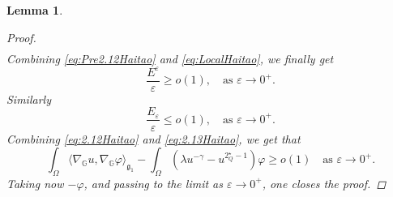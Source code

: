 \documentclass[11pt]{amsart}
\numberwithin{equation}{section} %
\newtheorem{lemma}[teo]{Lemma}
\theoremstyle{definition}
\begin{document}
\begin{lemma}
\begin{proof}
\begin{equation}
\begin{aligned}
			\end{aligned}
		\end{equation}
		Combining \eqref{eq:Pre2.12Haitao} and  \eqref{eq:LocalHaitao}, we finally get
		\begin{equation}\label{eq:2.12Haitao}
			\dfrac{E^{\varepsilon}}{\varepsilon} \geq o(1), \quad \textrm{as } \varepsilon \to 0^+.
		\end{equation}
		Similarly
		\begin{equation}\label{eq:2.13Haitao}
			\dfrac{E_{\varepsilon}}{\varepsilon} \leq o(1), \quad \textrm{as } \varepsilon \to 0^+.
		\end{equation}
		Combining \eqref{eq:2.12Haitao} and \eqref{eq:2.13Haitao}, we get that
		$$\int_{\Omega}\langle \nabla_{\mathbb{G}}u, \nabla_{\mathbb{G}}\varphi\rangle_{\mathfrak{g}_{1}} - \int_{\Omega}(\lambda u^{-\gamma}- u^{2^{\star}_{Q}-1})\varphi \geq o(1) \quad \textrm{as } \varepsilon\to 0^+.$$
		Taking now $-\varphi$, and passing to the limit as $\varepsilon\to 0^+$, one closes the proof.
	\end{proof}
\end{lemma}
\end{document}
